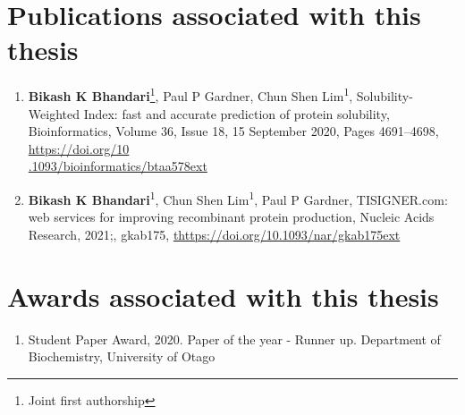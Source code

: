 \section*{Publications associated with this thesis}
\begin{enumerate}
	\item \textbf{Bikash K Bhandari}\footnote{\label{note1}Joint first authorship}, Paul P Gardner, Chun Shen Lim\textsuperscript{1}, Solubility-Weighted Index: fast and accurate prediction of protein solubility, Bioinformatics, Volume 36, Issue 18, 15 September 2020, Pages 4691–4698, \href{https://doi.org/10.1093/bioinformatics/btaa578}{https://doi.org/10\\.1093/bioinformatics/btaa578ext}
	
	
	\item \textbf{Bikash K Bhandari}\textsuperscript{1}, Chun Shen Lim\textsuperscript{1}, Paul P Gardner, TISIGNER.com: web services for improving recombinant protein production, Nucleic Acids Research, 2021;, gkab175, \href{https://doi.org/10.1093/nar/gkab175}{thttps://doi.org/10.1093/nar/gkab175ext}
	
\end{enumerate}



\section*{Awards associated with this thesis}
\begin{enumerate}
	\item Student Paper Award, 2020. Paper of the year - Runner up. Department of Biochemistry, University of Otago

\end{enumerate}